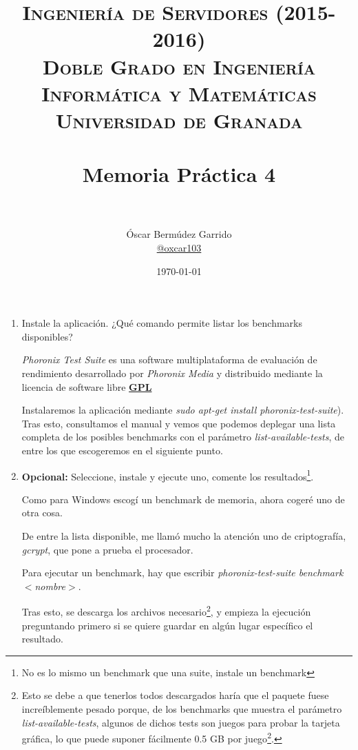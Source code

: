 \documentclass[paper=a4, fontsize=11pt]{scrartcl} %
\title{	
\normalfont \normalsize 
\textsc{{\bf Ingeniería de Servidores (2015-2016)} \\ Doble Grado en Ingeniería Informática y Matemáticas \\ Universidad de Granada} \\ [25pt] %
\horrule{0.5pt} \\[0.4cm] %
\huge Memoria Práctica 4 \\ %
\horrule{2pt} \\[0.5cm] %
}
\author{Óscar Bermúdez Garrido\\ \href{http://www.github.com/oxcar103}{@oxcar103}} %
\date{\normalsize\today} %
\numberwithin{equation}{section} %
\numberwithin{figure}{section} %
\numberwithin{table}{section} %
\begin{document}
\maketitle %
\newpage %
\tableofcontents %
\listoffigures

\newpage

\begin{enumerate}
	\section{Benchmarks populares}
	\subsection{Phoronix Suite}
		\item Instale la aplicación. ¿Qué comando permite listar los benchmarks disponibles?
		
		\textit{Phoronix Test Suite} es una software multiplataforma de evaluación de rendimiento
		desarrollado por \textit{Phoronix Media}\cite{phoronix-official} y distribuido mediante la 
		licencia de software libre \href{https://www.gnu.org/licenses/gpl.html}{\textbf{GPL}}
		
		Instalaremos la aplicación mediante \textit{sudo apt-get install phoronix-test-suite}). Tras
		esto, consultamos el manual \cite{man_phoronix} y vemos que podemos deplegar una lista completa
		de los posibles benchmarks con el parámetro \textit{list-available-tests}, de entre los que
		escogeremos en el siguiente punto.
		
		\item \textbf{Opcional:} Seleccione, instale y ejecute uno, comente los resultados\footnote{No
		es lo mismo un benchmark que una suite, instale un benchmark}.
		
		Como para Windows escogí un benchmark de memoria, ahora cogeré uno de otra cosa.
		
		De entre la lista disponible, me llamó mucho la atención uno de criptografía, \textit{gcrypt},
		que pone a prueba el procesador.
		
		Para ejecutar un benchmark, hay que escribir \textit{phoronix-test-suite benchmark $<$nombre$>$}.
		
		Tras esto, se descarga los archivos necesario\footnote{Esto se debe a que tenerlos todos
		descargados haría que el paquete fuese increíblemente pesado porque, de los benchmarks que
		muestra el parámetro \textit{list-available-tests}, algunos de dichos tests son juegos para
		probar la tarjeta gráfica, lo que puede suponer fácilmente 0.5 GB por juego\footnote{Nótese
		además que hay otro comando disponible llamado \textit{list-available-suites} que permite ver
		algunos bancos de pruebas, con lo cuál, el peso sería aún mayor.}.}, y empieza la ejecución
		preguntando primero si se quiere guardar en algún lugar específico el resultado.
		

\end{enumerate}
\end{document}
